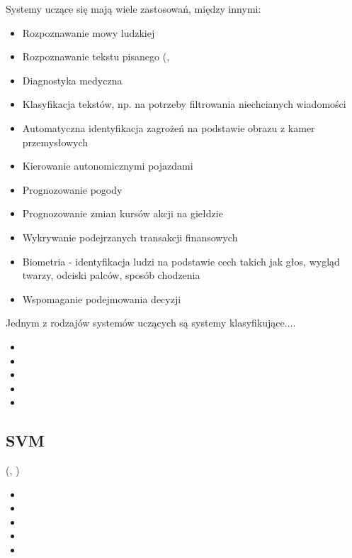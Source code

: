 Systemy uczące się mają wiele zastosowań, między innymi:
\begin{itemize}
	\item Rozpoznawanie mowy ludzkiej
	\item Rozpoznawanie tekstu pisanego (, 
	\item Diagnostyka medyczna
	\item Klasyfikacja tekstów, np. na potrzeby filtrowania niechcianych wiadomości
	\item Automatyczna identyfikacja zagrożeń na podstawie obrazu z kamer przemysłowych
	\item Kierowanie autonomicznymi pojazdami
	\item Prognozowanie pogody
	\item Prognozowanie zmian kursów akcji na giełdzie
	\item Wykrywanie podejrzanych transakcji finansowych
	\item Biometria - identyfikacja ludzi na podstawie cech takich jak głos, wygląd twarzy, odciski palców, sposób chodzenia
	\item Wspomaganie podejmowania decyzji
\end{itemize}

Jednym z rodzajów systemów uczących są systemy klasyfikujące....

\begin{itemize}
\item {}
\item {}
\item {}
\item {}
\item {}
\end{itemize}


\subsection{SVM}
    
 (, )

\begin{itemize}
\item {}
\item {}
\item {}
\item {}
\item {}
\end{itemize}

